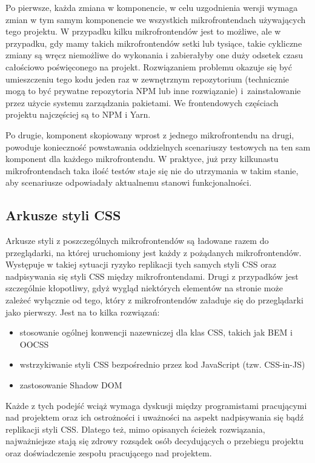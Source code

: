 \documentclass{SGGW-thesis}
\begin{document}
    Po pierwsze, każda zmiana w komponencie, w celu uzgodnienia wersji wymaga zmian w tym samym komponencie we wszystkich mikrofrontendach używających tego projektu. W przypadku kilku mikrofrontendów jest to możliwe, ale w przypadku, gdy mamy takich mikrofrontendów setki lub tysiące, takie cykliczne zmiany są wręcz niemożliwe do wykonania i zabierałyby one duży odsetek czasu całościowo poświęconego na projekt.
    Rozwiązaniem problemu okazuje się być umieszczeniu tego kodu jeden raz w zewnętrznym repozytorium (technicznie mogą to być prywatne repozytoria NPM lub inne rozwiązanie) i~zainstalowanie przez użycie systemu zarządzania pakietami. We frontendowych częściach projektu najczęściej są to NPM i Yarn.
    
    Po drugie, komponent skopiowany wprost z jednego mikrofrontendu na drugi, powoduje konieczność powstawania oddzielnych scenariuszy testowych na ten sam komponent dla każdego mikrofrontendu. W praktyce, już przy kilkunastu mikrofrontendach taka ilość testów staje się nie do utrzymania w takim stanie, aby scenariusze odpowiadały aktualnemu stanowi funkcjonalności.

    \subsection{Arkusze styli CSS}
    Arkusze styli z poszczególnych mikrofrontendów są ładowane razem do przeglądarki, na której uruchomiony jest każdy z pożądanych mikrofrontendów. Występuje w takiej sytuacji ryzyko replikacji tych samych styli CSS oraz nadpisywania się styli CSS między mikrofrontendami. Drugi z przypadków jest szczególnie kłopotliwy, gdyż wygląd niektórych elementów na stronie może zależeć wyłącznie od tego, który z mikrofrontendów załaduje się do przeglądarki jako pierwszy. Jest na to kilka rozwiązań:

    \begin{itemize}
      \item stosowanie ogólnej konwencji nazewniczej dla klas CSS, takich jak BEM i OOCSS
      \item wstrzykiwanie styli CSS bezpośrednio przez kod JavaScript (tzw. CSS-in-JS)
      \item zastosowanie Shadow DOM
    \end{itemize}

    Każde z tych podejść wciąż wymaga dyskusji między programistami pracującymi nad projektem oraz ich ostrożności i uważności na aspekt nadpisywania się bądź replikacji styli CSS. Dlatego też, mimo opisanych ścieżek rozwiązania, najważniejsze stają się zdrowy rozsądek osób decydujących o przebiegu projektu oraz doświadczenie zespołu pracującego nad projektem.
\end{document}

